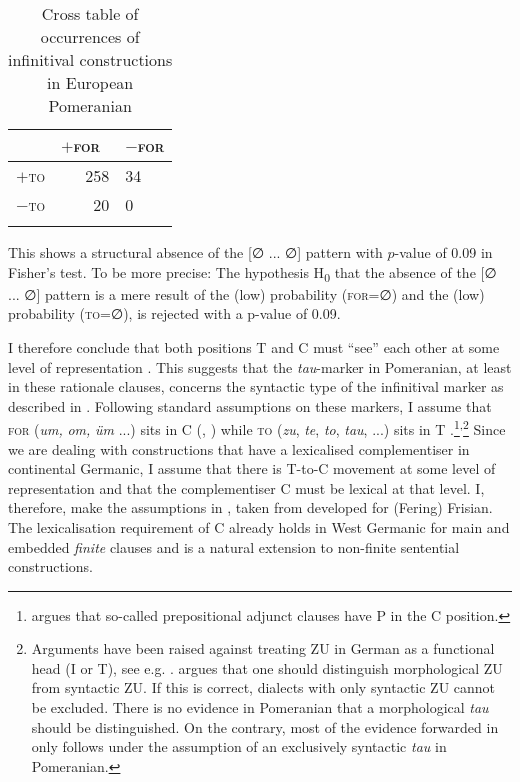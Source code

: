 \documentclass[output=paper,hidelinks,draftmode]{langscibook}
\begin{document}
\begin{table}
	\begin{tabularx}{.4\textwidth}{XrY}
		\lsptoprule
		   & $+$\textsc{for}~ & {}$-$\textsc{for}\\
		   \midrule
		  {}$+$\textsc{to} & 258 & 34\\
		  {}$-$\textsc{to} & 20 & 0\\
		\lspbottomrule
	\end{tabularx}
\caption{Cross table of occurrences of infinitival constructions in European Pomeranian}
\label{tab:postma:3}
\end{table}


This shows a structural absence of the [∅ ... ∅] pattern with $p$-value of 0.09 in Fisher's test. To be more precise: The hypothesis H\textsubscript{0} that the absence of the [∅ ... ∅] pattern is a mere result of the (low) probability (\textsc{for}=∅) and the (low) probability (\textsc{to}=∅), is rejected with a p-value of 0.09.

I therefore conclude that both positions T and C must ``see'' each other at some level of representation \citep[55]{Bennis1984}. This suggests that the \textit{tau}{}-marker in Pomeranian, at least in these rationale clauses, concerns the syntactic type of the infinitival marker as described in \citet{Brandner2006}. Following standard assumptions on these markers, I assume that \textsc{for} (\textit{um,} \textit{om,} \textit{üm} ...) sits in C (\citealt[133]{Koster1982}, \citealt[108]{VandenWyngaerd1987}) while \textsc{to} (\textit{zu}, \textit{te}, \textit{to}, \textit{tau}, ...) sits in T \citep{Evers1990, Sabel1996}.\footnote{\citet{Bennis1987} argues that so-called prepositional adjunct clauses have P in the C position.}\textsuperscript{,}\footnote{Arguments have been raised against treating ZU in German as a functional head (I or T), see e.g. \citet[273--274]{haider2010syntax}. \citet{Brandner2006} argues that one should distinguish morphological ZU from syntactic ZU. If this is correct, dialects with only syntactic ZU cannot be excluded. There is no evidence in Pomeranian that a morphological \textit{tau} should be distinguished. On the contrary, most of the evidence forwarded in \citet{Postma2014} only follows under the assumption of an exclusively syntactic \textit{tau} in Pomeranian.} Since we are dealing with constructions that have a lexicalised complementiser in continental Germanic, I assume that there is T-to-C movement at some level of representation and that the complementiser C must be lexical at that level. I, therefore, make the assumptions in , taken from \citet[106, 116]{Hoekstra1997} developed for (Fering) Frisian. The lexicalisation requirement of C already holds in West Germanic for main and embedded \textit{finite} clauses and  is a natural extension to non-finite sentential constructions.
\end{document}
